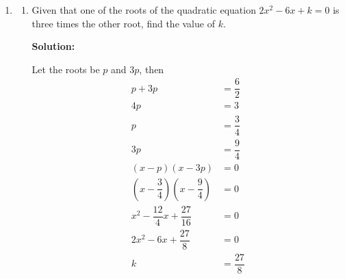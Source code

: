 \documentclass{report}
\newcommand{\sol}{\textbf{Solution:}}
\begin{document}
\begin{enumerate}[leftmargin=*]
\begin{enumerate}
              \item Given the functions $f g(x)=6 x-9$ and $g(x)=3 x+2$, find $f(x)$.

                    \sol{}

                    Let $y = g(x) = 3x + 2$, then $x = \dfrac{y-2}{3}$.
                    \begin{align*}
                        f(y) & = 6\left(\dfrac{y-2}{3}\right) - 9 \\
                             & = 2(y-2) - 9                       \\
                             & = 2y - 4 - 9                       \\
                             & = 2y - 13                          \\
                        f(x) & = 2x - 13
                    \end{align*}
          \end{enumerate}

    \item \begin{enumerate}
              \item Given that one of the roots of the quadratic equation $2 x^2-6 x+k=0$ is three
                    times the other root, find the value of $k$.

                    \sol{}

                    Let the roots be $p$ and $3p$, then
                    \begin{align*}
                        p+3p                              & = \dfrac{6}{2}  \\
                        4p                                & = 3             \\
                        p                                 & = \dfrac{3}{4}  \\
                        3p                                & = \dfrac{9}{4}  \\
                        (x-p)(x-3p)                       & = 0             \\
                        (x-\dfrac{3}{4})(x-\dfrac{9}{4})  & = 0             \\
                        x^2-\dfrac{12}{4}x+\dfrac{27}{16} & = 0             \\
                        2 x^2-6 x+\dfrac{27}{8}           & = 0             \\
                        k                                 & = \dfrac{27}{8}
                    \end{align*}


\end{enumerate}
\end{enumerate}
\end{document}
